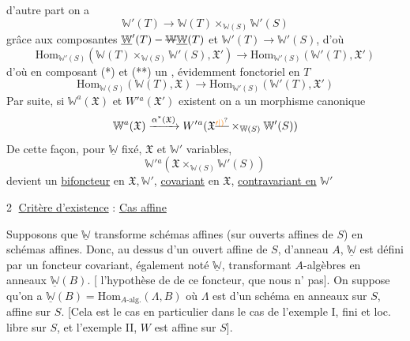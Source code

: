 d'autre part on a
\[
 \mathbb W'(T)\to\mathbb W(T)\times_{\mathbb W(S)}\mathbb W'(S)
\]
 grâce aux composantes $\underline{\mathbb W}'(T)-\deleted{\mathbb W}\underline{\mathbb W}(T)$ et $\mathbb W'(T)\to\mathbb W'(S)$, d'où
\[
 \mathrm{Hom}_{\mathbb W'(S)}(\mathbb W(T)\times_{\mathbb W(S)}\mathbb W'(S),\mathfrak X')\to\mathrm{Hom}_{\mathbb W'(S)}(\mathbb W'(T),\mathfrak X')\tag*{(**)}
\]
d'où en composant (*) et (**) un  , évidemment fonctoriel en $T$
\[
 \mathrm{Hom}_{\mathbb W(S)}(\mathbb W(T),\mathfrak X)\longrightarrow\mathrm{Hom}_{\mathbb W'(S)}(\mathbb W'(T),\mathfrak X')
\]
Par suite, si $\mathbb W^a(\mathfrak X)$ et $W'{}^a(\mathfrak X')$ existent on a un morphisme canonique
\[
 \mathbb W^a(\mathfrak X)\xrightarrow{\alpha^*(\mathfrak X)}W'{}^a(\mathfrak X\deleted{^{\unsure{\prime|)}}}\times_{\mathbb W(S)}\mathbb W'(S))
\]
De cette façon, pour $\underline{\mathbb W}$ fixé,   $\mathfrak X$ et $\mathbb W'$ variables,
\[
 \mathbb W'{}^a(\mathfrak X\times_{\mathbb W(S)}\mathbb W'(S))
\]
devient un \uline{bifoncteur} en $\mathfrak X,\mathbb W'$, \uline{covariant} en $\mathfrak X$, \uline{contravariant en} $\mathbb W'$

\textcircled{2} \uline{Critère d'existence} : \uline{Cas affine}


Supposons que $\underline{\mathbb W}$ transforme schémas affines (sur ouverts affines de $S$) en schémas affines. Donc, au dessus d'un ouvert affine de $S$, d'anneau $A$, $\underline{\mathbb W}$ est défini par un foncteur covariant, également noté $\underline{\mathbb W}$, transformant $A$-algèbres  en anneaux $\underline{\mathbb W}(B)$. [ l'hypothèse de   de ce foncteur, que nous n' pas]. On suppose qu'on a $\underline{\mathbb W}(B)=\mathrm{Hom}_{A\text{-alg.}}(\Lambda,B)$ où $\Lambda$ est   d'un schéma en anneaux  sur $S$, affine sur $S$.
[Cela est le cas en particulier dans le cas de l'exemple I,   fini et loc. libre sur $S$, et l'exemple II,  $W$  est affine sur $S$].

